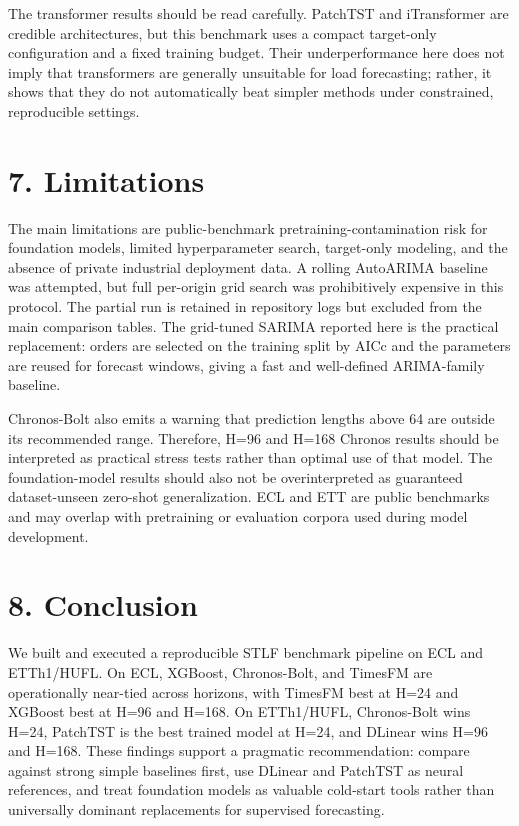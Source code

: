 The transformer results should be read carefully. PatchTST and
iTransformer are credible architectures, but this benchmark uses a
compact target-only configuration and a fixed training budget. Their
underperformance here does not imply that transformers are generally
unsuitable for load forecasting; rather, it shows that they do not
automatically beat simpler methods under constrained, reproducible
settings.

\section{7. Limitations}\label{limitations}

The main limitations are public-benchmark pretraining-contamination risk
for foundation models, limited hyperparameter search, target-only
modeling, and the absence of private industrial deployment data. A
rolling AutoARIMA baseline was attempted, but full per-origin grid
search was prohibitively expensive in this protocol. The partial run is
retained in repository logs but excluded from the main comparison
tables. The grid-tuned SARIMA reported here is the practical
replacement: orders are selected on the training split by AICc and the
parameters are reused for forecast windows, giving a fast and
well-defined ARIMA-family baseline.

Chronos-Bolt also emits a warning that prediction lengths above 64 are
outside its recommended range. Therefore, H=96 and H=168 Chronos results
should be interpreted as practical stress tests rather than optimal use
of that model. The foundation-model results should also not be
overinterpreted as guaranteed dataset-unseen zero-shot generalization.
ECL and ETT are public benchmarks and may overlap with pretraining or
evaluation corpora used during model development.

\section{8. Conclusion}\label{conclusion}

We built and executed a reproducible STLF benchmark pipeline on ECL and
ETTh1/HUFL. On ECL, XGBoost, Chronos-Bolt, and TimesFM are operationally
near-tied across horizons, with TimesFM best at H=24 and XGBoost best at
H=96 and H=168. On ETTh1/HUFL, Chronos-Bolt wins H=24, PatchTST is the
best trained model at H=24, and DLinear wins H=96 and H=168. These
findings support a pragmatic recommendation: compare against strong
simple baselines first, use DLinear and PatchTST as neural references,
and treat foundation models as valuable cold-start tools rather than
universally dominant replacements for supervised forecasting.

